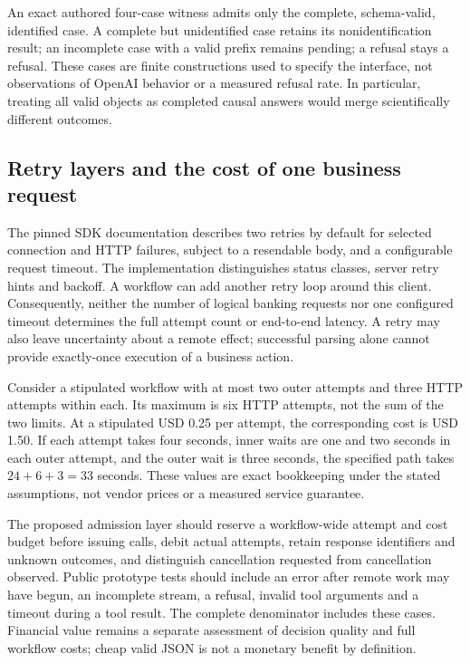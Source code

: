 An exact authored four-case witness admits only the complete, schema-valid, identified case. A complete but
unidentified case retains its nonidentification result; an incomplete case with a valid prefix remains pending;
a refusal stays a refusal. These cases are finite constructions used to specify the interface, not observations
of OpenAI behavior or a measured refusal rate. In particular, treating all valid objects as completed causal
answers would merge scientifically different outcomes.~\citep{exec28_oa_reference}

\subsection{Retry layers and the cost of one business request}
The pinned SDK documentation describes two retries by default for selected connection and HTTP failures,
subject to a resendable body, and a configurable request timeout. The implementation distinguishes status
classes, server retry hints and backoff. A workflow can add another retry loop around this client. Consequently,
neither the number of logical banking requests nor one configured timeout determines the full attempt count or
end-to-end latency. A retry may also leave uncertainty about a remote effect; successful parsing alone cannot
provide exactly-once execution of a business action.~\citep{exec28_oa_sdk}

Consider a stipulated workflow with at most two outer attempts and three HTTP attempts within each. Its maximum
is six HTTP attempts, not the sum of the two limits. At a stipulated USD 0.25 per attempt, the corresponding
cost is USD 1.50. If each attempt takes four seconds, inner waits are one and two seconds in each outer attempt,
and the outer wait is three seconds, the specified path takes \(24+6+3=33\) seconds. These values are exact
bookkeeping under the stated assumptions, not vendor prices or a measured service guarantee.~\citep{exec28_oa_reference}

The proposed admission layer should reserve a workflow-wide attempt and cost budget before issuing calls,
debit actual attempts, retain response identifiers and unknown outcomes, and distinguish cancellation requested
from cancellation observed. Public prototype tests should include an error after remote work may have begun,
an incomplete stream, a refusal, invalid tool arguments and a timeout during a tool result. The complete
denominator includes these cases. Financial value remains a separate assessment of decision quality and full
workflow costs; cheap valid JSON is not a monetary benefit by definition.


